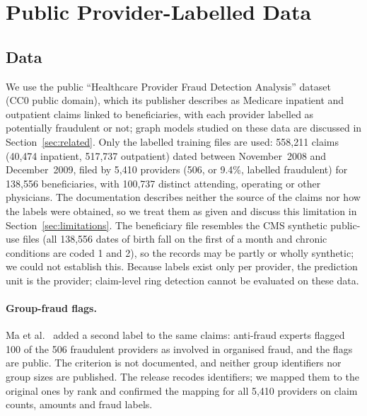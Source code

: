 \documentclass[pdflatex,sn-vancouver-num]{sn-jnl}
\begin{document}
\section{Public Provider-Labelled Data}\label{sec:realdata}

\subsection{Data}\label{sec:realdata_data}
We use the public ``Healthcare Provider Fraud Detection Analysis''
dataset~\cite{kaggle2019} (CC0 public domain), which its publisher describes
as Medicare inpatient and outpatient claims linked to beneficiaries, with
each provider labelled as potentially fraudulent or not; graph models
studied on these data are discussed in Section~\ref{sec:related}. Only the
labelled training files are used:
558{,}211 claims (40{,}474 inpatient, 517{,}737 outpatient) dated between
November~2008 and December~2009, filed by 5{,}410 providers (506, or 9.4\%,
labelled fraudulent) for 138{,}556 beneficiaries, with 100{,}737 distinct
attending, operating or other physicians. The documentation describes
neither the source of the claims nor how the labels were obtained, so we
treat them as given and discuss this limitation in
Section~\ref{sec:limitations}. The beneficiary file resembles the CMS synthetic
public-use files (all 138{,}556 dates of birth fall on the first of a month and
chronic conditions are coded 1 and 2), so the records may be partly or wholly
synthetic; we could not establish this. Because labels
exist only per provider, the prediction unit is the provider; claim-level
ring detection cannot be evaluated on these data.

\paragraph{Group-fraud flags.} Ma et al.~\cite{ma2023rdpgl} added a second
label to the same claims: anti-fraud experts flagged 100 of the 506 fraudulent
providers as involved in organised fraud, and the flags are
public. The criterion is not documented, and neither
group identifiers nor group sizes are published. The release recodes
identifiers; we mapped them to the original ones by rank and confirmed the
mapping for all 5{,}410 providers on claim counts, amounts and fraud labels.
\end{document}

